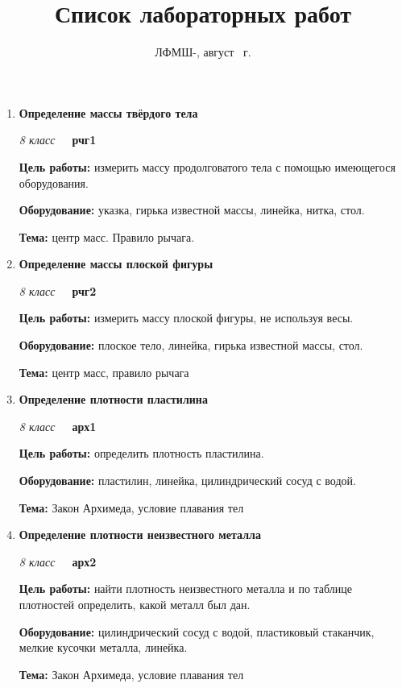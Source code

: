 \documentclass[a4paper,10pt]{article}
\title{Список лабораторных работ}
\date{ЛФМШ-\arabic{LFMSHnumber}, август {\the \year}~г.}
\newcommand{\labtitle}[7]{
	\textbf{#2}\par
	\textit{#1 класс}~~~\textbf{#3}\par
	\textbf{Цель работы:} #4\par
	\textbf{Оборудование:} #5\par
	\textbf{Тема:} #6
}
\begin{document}
\maketitle
\begin{enumerate}
	\item \labtitle
		{8}
		{Определение массы твёрдого тела}
		{рчг1}
		{измерить массу продолговатого тела с помощью имеющегося оборудования.}
		{указка, гирька известной массы, линейка, нитка, стол.}
		{центр масс. Правило рычага.}
		{\item Проводим несколько экспериментов, старые отметки должны быть убраны заранее лаборантами
			\item С какой точностью определяется центр масс?
			\item Что, если палка не перпендикулярна?
		\item Что вообще такое "--- <<центр масс>>? (такая точка тела или продолжения тела, при приложении силы к которой тело не станет вращаться)}
	\item \labtitle
		{8}
		{Определение массы плоской фигуры}
		{рчг2}
		{измерить массу плоской фигуры, не используя весы.}
		{плоское тело, линейка, гирька известной массы, стол.}
		{центр масс, правило рычага}
		{\item Проводим несколько экспериментов
		\item Как найти центр гирьки? Можно вырезать кружочек и складывать его
		\item Нужно ли опускать перпендикуляры на линию края стола?
		\item Что такое <<центр масс>>?}
	\item \labtitle
		{8}
		{Определение плотности пластилина}
		{арх1}
		{определить плотность пластилина.}
		{пластилин, линейка, цилиндрический сосуд с водой.}
		{Закон Архимеда, условие плавания тел}
		{\item Почему вытесняемый телом объём $V=S\Delta h$?
		\item Откуда берётся закон Архимеда?
		\item Сначала пусть подумают сами}
	\item \labtitle
		{8}
		{Определение плотности неизвестного металла}
		{арх2}
		{найти плотность неизвестного металла и по таблице плотностей определить, какой металл был дан.}
		{цилиндрический сосуд с водой, пластиковый стаканчик, мелкие кусочки металла, линейка.}
		{Закон Архимеда, условие плавания тел}
		{\item Сначала пусть подумают сами
		\item Рассуждения про закон Архимеда те же, что и в лабе про пластилин}

\end{enumerate}
\end{document}
